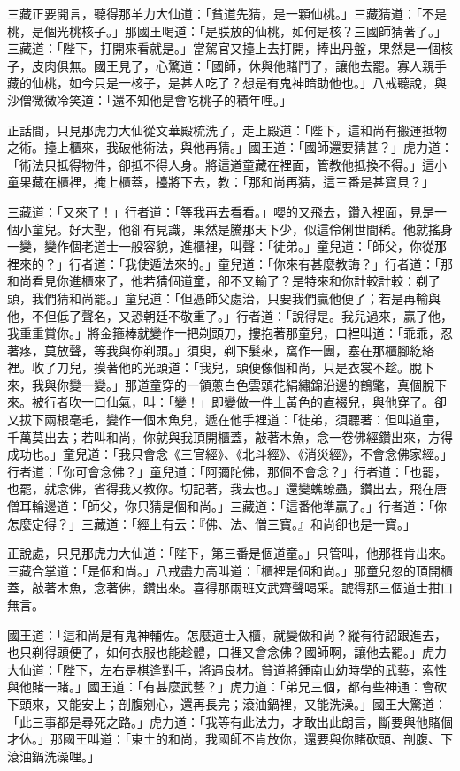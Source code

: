 三藏正要開言，聽得那羊力大仙道：「貧道先猜，是一顆仙桃。」三藏猜道：「不是桃，是個光桃核子。」那國王喝道：「是朕放的仙桃，如何是核？三國師猜著了。」三藏道：「陛下，打開來看就是。」當駕官又擡上去打開，捧出丹盤，果然是一個核子，皮肉俱無。國王見了，心驚道：「國師，休與他賭鬥了，讓他去罷。寡人親手藏的仙桃，如今只是一核子，是甚人吃了？想是有鬼神暗助他也。」八戒聽說，與沙僧微微冷笑道：「還不知他是會吃桃子的積年哩。」

正話間，只見那虎力大仙從文華殿梳洗了，走上殿道：「陛下，這和尚有搬運抵物之術。擡上櫃來，我破他術法，與他再猜。」國王道：「國師還要猜甚？」虎力道：「術法只抵得物件，卻抵不得人身。將這道童藏在裡面，管教他抵換不得。」這小童果藏在櫃裡，掩上櫃蓋，擡將下去，教：「那和尚再猜，這三番是甚寶貝？」

三藏道：「又來了！」行者道：「等我再去看看。」嚶的又飛去，鑽入裡面，見是一個小童兒。好大聖，他卻有見識，果然是騰那天下少，似這伶俐世間稀。他就搖身一變，變作個老道士一般容貌，進櫃裡，叫聲：「徒弟。」童兒道：「師父，你從那裡來的？」行者道：「我使遁法來的。」童兒道：「你來有甚麼教誨？」行者道：「那和尚看見你進櫃來了，他若猜個道童，卻不又輸了？是特來和你計較計較：剃了頭，我們猜和尚罷。」童兒道：「但憑師父處治，只要我們贏他便了；若是再輸與他，不但低了聲名，又恐朝廷不敬重了。」行者道：「說得是。我兒過來，贏了他，我重重賞你。」將金箍棒就變作一把剃頭刀，摟抱著那童兒，口裡叫道：「乖乖，忍著疼，莫放聲，等我與你剃頭。」須臾，剃下髮來，窩作一團，塞在那櫃腳紇絡裡。收了刀兒，摸著他的光頭道：「我兒，頭便像個和尚，只是衣裳不趁。脫下來，我與你變一變。」那道童穿的一領蔥白色雲頭花絹繡錦沿邊的鶴氅，真個脫下來。被行者吹一口仙氣，叫：「變！」即變做一件土黃色的直裰兒，與他穿了。卻又拔下兩根毫毛，變作一個木魚兒，遞在他手裡道：「徒弟，須聽著：但叫道童，千萬莫出去；若叫和尚，你就與我頂開櫃蓋，敲著木魚，念一卷佛經鑽出來，方得成功也。」童兒道：「我只會念《三官經》、《北斗經》、《消災經》，不會念佛家經。」行者道：「你可會念佛？」童兒道：「阿彌陀佛，那個不會念？」行者道：「也罷，也罷，就念佛，省得我又教你。切記著，我去也。」還變蟭蟟蟲，鑽出去，飛在唐僧耳輪邊道：「師父，你只猜是個和尚。」三藏道：「這番他準贏了。」行者道：「你怎麼定得？」三藏道：「經上有云：『佛、法、僧三寶。』和尚卻也是一寶。」

正說處，只見那虎力大仙道：「陛下，第三番是個道童。」只管叫，他那裡肯出來。三藏合掌道：「是個和尚。」八戒盡力高叫道：「櫃裡是個和尚。」那童兒忽的頂開櫃蓋，敲著木魚，念著佛，鑽出來。喜得那兩班文武齊聲喝采。諕得那三個道士拑口無言。

國王道：「這和尚是有鬼神輔佐。怎麼道士入櫃，就變做和尚？縱有待詔跟進去，也只剃得頭便了，如何衣服也能趁體，口裡又會念佛？國師啊，讓他去罷。」虎力大仙道：「陛下，左右是棋逢對手，將遇良材。貧道將鍾南山幼時學的武藝，索性與他賭一賭。」國王道：「有甚麼武藝？」虎力道：「弟兄三個，都有些神通：會砍下頭來，又能安上；剖腹剜心，還再長完；滾油鍋裡，又能洗澡。」國王大驚道：「此三事都是尋死之路。」虎力道：「我等有此法力，才敢出此朗言，斷要與他賭個才休。」那國王叫道：「東土的和尚，我國師不肯放你，還要與你賭砍頭、剖腹、下滾油鍋洗澡哩。」

